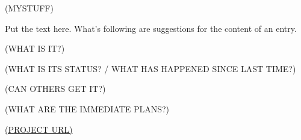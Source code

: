 \documentclass{scrreprt}
\begin{document}
\begin{hcarentry}{(MYSTUFF)}
\makeheader

Put the text here. What's following are suggestions for the content of an entry.

(WHAT IS IT?)

(WHAT IS ITS STATUS? / WHAT HAS HAPPENED SINCE LAST TIME?)

(CAN OTHERS GET IT?)

(WHAT ARE THE IMMEDIATE PLANS?)

\FurtherReading
  \url{(PROJECT URL)}
\end{hcarentry}
\end{document}
